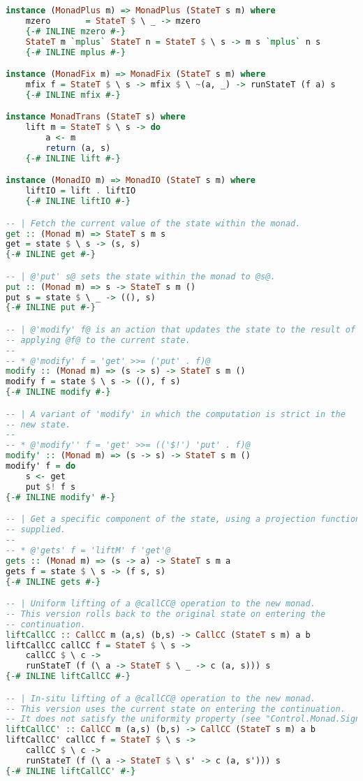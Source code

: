 \begin{lstlisting}[language=Haskell]
instance (MonadPlus m) => MonadPlus (StateT s m) where
    mzero       = StateT $ \ _ -> mzero
    {-# INLINE mzero #-}
    StateT m `mplus` StateT n = StateT $ \ s -> m s `mplus` n s
    {-# INLINE mplus #-}

instance (MonadFix m) => MonadFix (StateT s m) where
    mfix f = StateT $ \ s -> mfix $ \ ~(a, _) -> runStateT (f a) s
    {-# INLINE mfix #-}

instance MonadTrans (StateT s) where
    lift m = StateT $ \ s -> do
        a <- m
        return (a, s)
    {-# INLINE lift #-}

instance (MonadIO m) => MonadIO (StateT s m) where
    liftIO = lift . liftIO
    {-# INLINE liftIO #-}

-- | Fetch the current value of the state within the monad.
get :: (Monad m) => StateT s m s
get = state $ \ s -> (s, s)
{-# INLINE get #-}

-- | @'put' s@ sets the state within the monad to @s@.
put :: (Monad m) => s -> StateT s m ()
put s = state $ \ _ -> ((), s)
{-# INLINE put #-}

-- | @'modify' f@ is an action that updates the state to the result of
-- applying @f@ to the current state.
--
-- * @'modify' f = 'get' >>= ('put' . f)@
modify :: (Monad m) => (s -> s) -> StateT s m ()
modify f = state $ \ s -> ((), f s)
{-# INLINE modify #-}

-- | A variant of 'modify' in which the computation is strict in the
-- new state.
--
-- * @'modify'' f = 'get' >>= (('$!') 'put' . f)@
modify' :: (Monad m) => (s -> s) -> StateT s m ()
modify' f = do
    s <- get
    put $! f s
{-# INLINE modify' #-}

-- | Get a specific component of the state, using a projection function
-- supplied.
--
-- * @'gets' f = 'liftM' f 'get'@
gets :: (Monad m) => (s -> a) -> StateT s m a
gets f = state $ \ s -> (f s, s)
{-# INLINE gets #-}

-- | Uniform lifting of a @callCC@ operation to the new monad.
-- This version rolls back to the original state on entering the
-- continuation.
liftCallCC :: CallCC m (a,s) (b,s) -> CallCC (StateT s m) a b
liftCallCC callCC f = StateT $ \ s ->
    callCC $ \ c ->
    runStateT (f (\ a -> StateT $ \ _ -> c (a, s))) s
{-# INLINE liftCallCC #-}

-- | In-situ lifting of a @callCC@ operation to the new monad.
-- This version uses the current state on entering the continuation.
-- It does not satisfy the uniformity property (see "Control.Monad.Signatures").
liftCallCC' :: CallCC m (a,s) (b,s) -> CallCC (StateT s m) a b
liftCallCC' callCC f = StateT $ \ s ->
    callCC $ \ c ->
    runStateT (f (\ a -> StateT $ \ s' -> c (a, s'))) s
{-# INLINE liftCallCC' #-}


\end{lstlisting}
